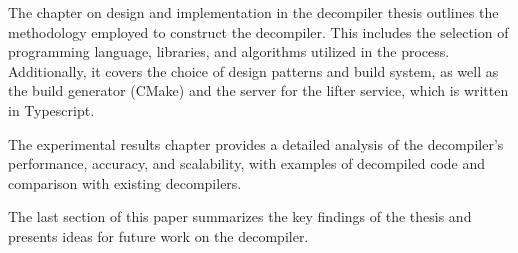 The chapter on design and implementation in the decompiler thesis outlines the methodology employed
to construct the decompiler. This includes the selection of programming language, libraries, and
algorithms utilized in the process. Additionally, it covers the choice of design patterns and build
system, as well as the build generator (CMake) and the server for the lifter service, which is
written in Typescript.

The experimental results chapter provides a detailed analysis of the decompiler's performance,
accuracy, and scalability, with examples of decompiled code and comparison with existing decompilers.

The last section of this paper summarizes the key findings of the thesis and presents ideas
for future work on the decompiler.